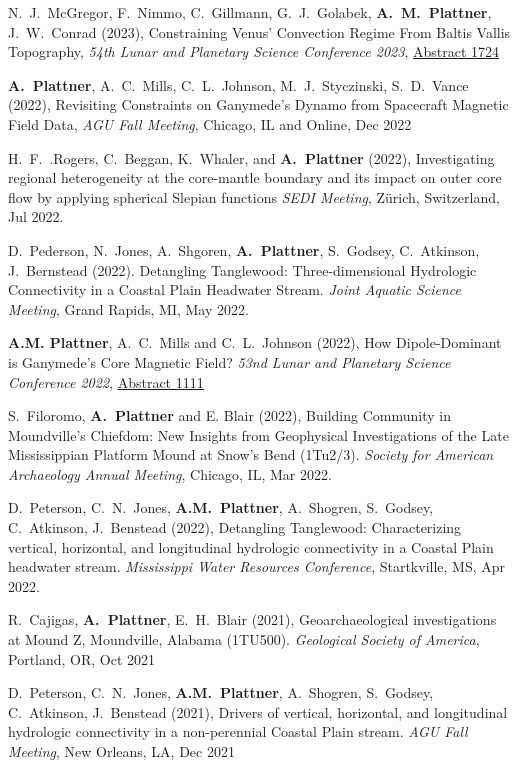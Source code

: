 \documentclass[10pt]{article}
\begin{document}
\spcp
N.~J.~McGregor, F.~Nimmo, C.~Gillmann, G.~J.~Golabek, \textbf{A.~M.~Plattner}, J.~W.~Conrad (2023), Constraining Venus' Convection Regime From Baltis Vallis Topography, \emph{54th Lunar and Planetary Science Conference 2023},
\href{https://www.hou.usra.edu/meetings/lpsc2023/pdf/1724.pdf}{Abstract 1724}

\spcp \textbf{A.~Plattner}, A.~C.~Mills, C.~L.~Johnson,
M.~J.~Styczinski, S.~D.~Vance (2022), Revisiting Constraints on
Ganymede's Dynamo from Spacecraft Magnetic Field Data, \emph{AGU Fall
Meeting}, Chicago, IL and Online, Dec 2022

\spcp H.~F.~.Rogers, C.~Beggan, K.~Whaler, and \textbf{A.~Plattner}
(2022), Investigating regional heterogeneity at the core-mantle
boundary and its impact on outer core flow by applying spherical
Slepian functions \emph{SEDI Meeting}, Z\"urich, Switzerland, Jul 2022.

\spcp D.~Pederson, N.~Jones, A.~Shgoren, \textbf{A.~Plattner},
S.~Godsey, C.~Atkinson, J.~Bernstead (2022). Detangling Tanglewood:
Three-dimensional Hydrologic Connectivity in a Coastal Plain Headwater
Stream. \emph{Joint Aquatic Science Meeting}, Grand Rapids, MI, May
2022.

\spcp
\textbf{A.M. Plattner}, A.~C.~Mills and C.~L.~Johnson (2022), How Dipole-Dominant is Ganymede's Core Magnetic Field?
\emph{53nd Lunar and Planetary Science Conference 2022},
\href{https://www.hou.usra.edu/meetings/lpsc2022/pdf/1111.pdf}{Abstract 1111}

\spcp S.~Filoromo, \textbf{A.~Plattner} and E. Blair (2022), Building
Community in Moundville's Chiefdom: New Insights from Geophysical
Investigations of the Late Mississippian Platform Mound at Snow's Bend
(1Tu2/3). \emph{Society for American Archaeology Annual Meeting}, Chicago,
IL, Mar 2022.

\spcp D.~Peterson, C.~N.~Jones, \textbf{A.M.~Plattner}, A.~Shogren,
S.~Godsey, C.~Atkinson, J.~Benstead (2022), Detangling Tanglewood:
Characterizing vertical, horizontal, and longitudinal hydrologic
connectivity in a Coastal Plain headwater stream. \emph{Mississippi
Water Resources Conference}, Startkville, MS, Apr 2022.

\spcp R.~Cajigas, \textbf{A.~Plattner}, E.~H.~Blair (2021),
Geoarchaeological investigations at Mound Z, Moundville, Alabama
(1TU500). \emph{Geological Society of America}, Portland, OR, Oct 2021

\spcp D.~Peterson, C.~N.~Jones, \textbf{A.M.~Plattner}, A.~Shogren,
S.~Godsey, C.~Atkinson, J.~Benstead (2021), Drivers of vertical,
horizontal, and longitudinal hydrologic connectivity in a
non-perennial Coastal Plain stream. \emph{AGU Fall Meeting}, New
Orleans, LA, Dec 2021
\end{document}
